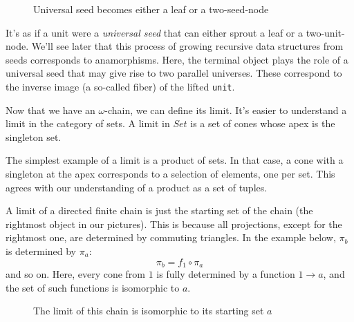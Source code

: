 \documentclass[11pt]{amsart}
\newcommand{\hask}[1]{\texttt{#1}}
\begin{document}
\begin{figure}[H]
\caption{Universal seed becomes either a leaf or a two-seed-node}
\end{figure}



It's as if a unit were a \emph{universal seed} that can either sprout a leaf or a two-unit-node. We'll see later that this process of growing recursive data structures from seeds corresponds to anamorphisms. Here, the terminal object plays the role of a universal seed that may give rise to two parallel universes. These correspond to the inverse image (a so-called fiber) of the lifted \hask{unit}.

Now that we have an $\omega$-chain, we can define its limit. It's easier to understand a limit in the category of sets. A limit in $Set$ is a set of cones whose apex is the singleton set. 

The simplest example of a limit is a product of sets. In that case, a cone with a singleton at the apex corresponds to a selection of elements, one per set. This agrees with our understanding of a product as a set of tuples. 

A limit of a directed finite chain is just the starting set of the chain (the rightmost object in our pictures). This is because all projections, except for the rightmost one, are determined by commuting triangles. In the example below, $\pi_b$ is determined by $\pi_a$:
\[\pi_b = f_1 \circ \pi_a\]
and so on. Here, every cone from $1$ is fully determined by a function $1 \to a$, and the set of such functions is isomorphic to $a$.
\begin{figure}[H]
\centering
{}
\caption{The limit of this chain is isomorphic to its starting set $a$}
\end{figure}
\end{document}
